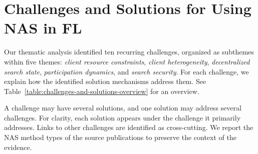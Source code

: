 \chapter{Challenges and Solutions for Using NAS in FL}\label{chapter:nas_in_fl_ch_and_sol}

Our thematic analysis identified ten recurring challenges, organized as subthemes within five themes: \textit{client resource constraints}, \textit{client heterogeneity}, \textit{decentralized search state}, \textit{participation dynamics}, and \textit{search security}. For each challenge, we explain how the identified solution mechanisms address them. See Table~\ref{table:challenges-and-solutions-overview} for an overview.

A challenge may have several solutions, and one solution may address several challenges. For clarity, each solution appears under the challenge it primarily addresses. Links to other challenges are identified as cross-cutting. We report the NAS method types of the source publications to preserve the context of the evidence.
